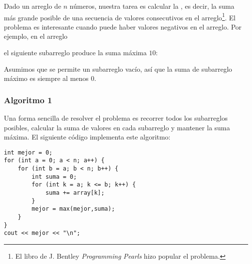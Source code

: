 Dado un arreglo de $n$ números,
nuestra tarea es calcular la
, es decir,
la suma más grande posible de
una secuencia de valores consecutivos
en el arreglo\footnote{El libro de J. Bentley \emph{Programming Pearls} \cite{ben86} hizo popular el problema.}.
El problema es interesante cuando puede haber
valores negativos en el arreglo.
Por ejemplo, en el arreglo
\begin{center}
\end{center}
\begin{samepage}
el siguiente subarreglo produce la suma máxima $10$:
\begin{center}
\end{center}
\end{samepage}

Asumimos que se permite un subarreglo vacío,
así que la suma de subarreglo máximo es siempre al menos $0$.

\subsubsection{Algoritmo 1}

Una forma sencilla de resolver el problema
es recorrer todos los subarreglos posibles,
calcular la suma de valores en cada subarreglo y mantener
la suma máxima.
El siguiente código implementa este algoritmo:

\begin{lstlisting}
int mejor = 0;
for (int a = 0; a < n; a++) {
    for (int b = a; b < n; b++) {
        int suma = 0;
        for (int k = a; k <= b; k++) {
            suma += array[k];
        }
        mejor = max(mejor,suma);
    }
}
cout << mejor << "\n";
\end{lstlisting}

